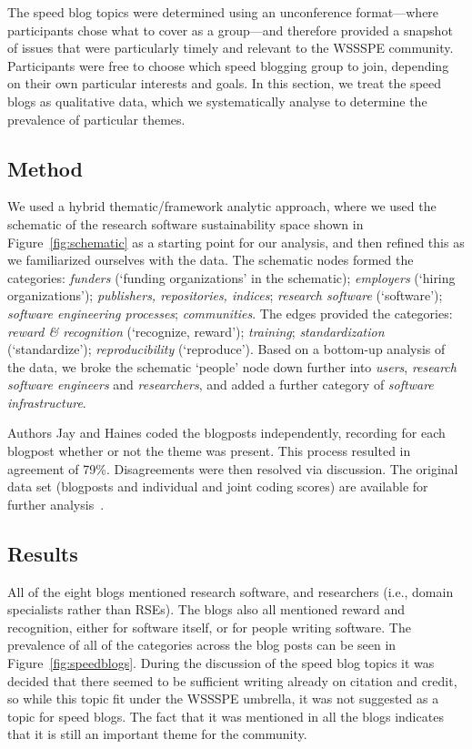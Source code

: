 \documentclass[11pt,letterpaper]{article}
\newcommand{\note}[1]{ {\textcolor{blueish}        { ***Note: #1 }}}
\begin{document}

The speed blog topics were determined using an unconference format---where participants chose what to cover as a group---and therefore provided a snapshot of issues that were particularly timely and relevant to the WSSSPE community. Participants were free to choose which speed blogging group to join, depending on their own particular interests and goals. In this section, we treat the speed blogs as qualitative data, which we systematically analyse to determine the prevalence of particular themes.

\subsection{Method} 
We used a hybrid thematic/framework analytic approach, where we used the schematic of the research software sustainability space shown in Figure~\ref{fig:schematic} as a starting point for our analysis, and then refined this as we familiarized ourselves with the data. The schematic nodes formed the categories: \emph{funders} (`funding organizations' in the schematic); \emph{employers} (`hiring organizations'); \emph{publishers, repositories, indices}; \emph{research software} (`software'); \emph{software engineering processes}; \emph{communities}. The edges provided the categories: \emph{reward \& recognition} (`recognize, reward'); \emph{training}; \emph{standardization} (`standardize'); \emph{reproducibility} (`reproduce'). Based on a bottom-up analysis of the data, we broke the schematic `people' node down further into \emph{users}, \emph{research software engineers} and \emph{researchers}, and added a further category of \emph{software infrastructure}.

Authors Jay and Haines coded the blogposts independently, recording for each blogpost whether or not the theme was present. This process resulted in agreement of 79\%. Disagreements were then resolved via discussion. The original data set (blogposts and individual and joint coding scores) are available for further analysis~\cite{data:speed-blog-analysis}.

\subsection{Results}
All of the eight blogs mentioned research software, and researchers (i.e., domain specialists rather than RSEs). The blogs also all mentioned reward and recognition, either for software itself, or for people writing software. The prevalence of all of the categories across the blog posts can be seen in Figure~\ref{fig:speedblogs}. During the discussion of the speed blog topics it was decided that there seemed to be sufficient writing already on citation and credit, so while this topic fit under the WSSSPE umbrella, it was not suggested as a topic for speed blogs. The fact that it was mentioned in all the blogs indicates that it is still an important theme for the community.
\end{document}

